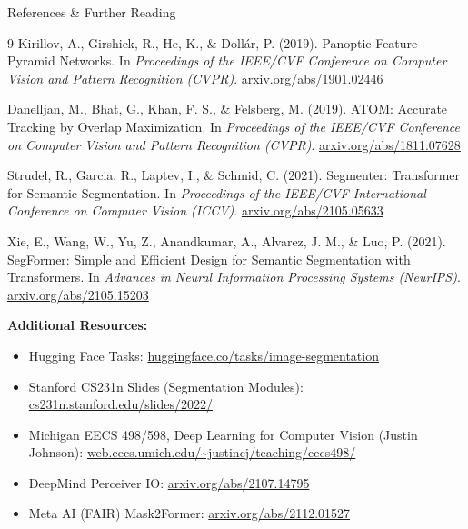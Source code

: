 \begin{frame}[allowframebreaks]{References \& Further Reading}
\begin{thebibliography}{9}
        Kirillov, A., Girshick, R., He, K., \& Doll\'ar, P. (2019).
        \newblock Panoptic Feature Pyramid Networks.
        \newblock In \emph{Proceedings of the IEEE/CVF Conference on Computer Vision and Pattern Recognition (CVPR)}.
        \newblock \href{https://arxiv.org/abs/1901.02446}{arxiv.org/abs/1901.02446}

        Danelljan, M., Bhat, G., Khan, F. S., \& Felsberg, M. (2019).
        \newblock ATOM: Accurate Tracking by Overlap Maximization.
        \newblock In \emph{Proceedings of the IEEE/CVF Conference on Computer Vision and Pattern Recognition (CVPR)}.
        \newblock \href{https://arxiv.org/abs/1811.07628}{arxiv.org/abs/1811.07628}

        Strudel, R., Garcia, R., Laptev, I., \& Schmid, C. (2021).
        \newblock Segmenter: Transformer for Semantic Segmentation.
        \newblock In \emph{Proceedings of the IEEE/CVF International Conference on Computer Vision (ICCV)}.
        \newblock \href{https://arxiv.org/abs/2105.05633}{arxiv.org/abs/2105.05633}

        Xie, E., Wang, W., Yu, Z., Anandkumar, A., Alvarez, J. M., \& Luo, P. (2021).
        \newblock SegFormer: Simple and Efficient Design for Semantic Segmentation with Transformers.
        \newblock In \emph{Advances in Neural Information Processing Systems (NeurIPS)}.
        \newblock \href{https://arxiv.org/abs/2105.15203}{arxiv.org/abs/2105.15203}
    \end{thebibliography}

    \vspace{1em}
    \textbf{Additional Resources:}
    \begin{itemize}
        \item Hugging Face Tasks: \href{https://huggingface.co/tasks/image-segmentation}{huggingface.co/tasks/image-segmentation}
        \item Stanford CS231n Slides (Segmentation Modules): \href{https://cs231n.stanford.edu/slides/2022/}{cs231n.stanford.edu/slides/2022/}
        \item Michigan EECS 498/598, Deep Learning for Computer Vision (Justin Johnson): \href{https://web.eecs.umich.edu/~justincj/teaching/eecs498/}{web.eecs.umich.edu/\textasciitilde justincj/teaching/eecs498/}
        \item DeepMind Perceiver IO: \href{https://arxiv.org/abs/2107.14795}{arxiv.org/abs/2107.14795}
        \item Meta AI (FAIR) Mask2Former: \href{https://arxiv.org/abs/2112.01527}{arxiv.org/abs/2112.01527}
    \end{itemize}
\end{frame}